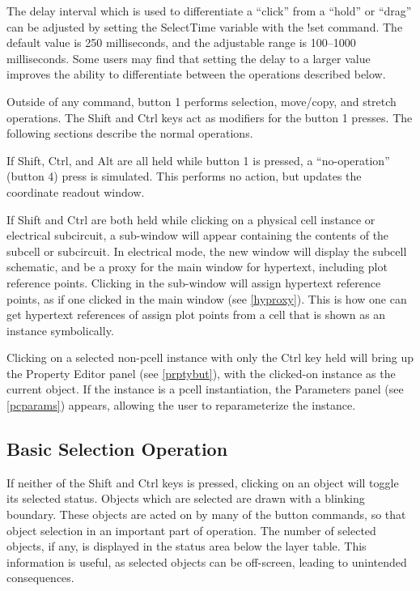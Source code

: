 The delay interval which is used to differentiate a ``click'' from a
``hold'' or ``drag'' can be adjusted by setting the {\cb SelectTime}
variable with the {\cb !set} command.  The default value is 250
milliseconds, and the adjustable range is 100--1000 milliseconds. 
Some users may find that setting the delay to a larger value improves
the ability to differentiate between the operations described below.

Outside of any command, button 1 performs selection, move/copy, and
stretch operations.  The {\kb Shift} and {\kb Ctrl} keys act as
modifiers for the button 1 presses.  The following sections describe
the normal operations.

If {\kb Shift}, {\kb Ctrl}, and {\kb Alt} are all held while button 1
is pressed, a ``no-operation'' (button 4) press is simulated.  This
performs no action, but updates the coordinate readout window.

If {\kb Shift} and {\kb Ctrl} are both held while clicking on a
physical cell instance or electrical subcircuit, a sub-window will
appear containing the contents of the subcell or subcircuit.  In
electrical mode, the new window will display the subcell schematic,
and be a proxy for the main window for hypertext, including plot
reference points.  Clicking in the sub-window will assign hypertext
reference points, as if one clicked in the main window (see
\ref{hyproxy}).  This is how one can get hypertext references of
assign plot points from a cell that is shown as an instance
symbolically.

Clicking on a selected non-pcell instance with only the {\kb Ctrl} key
held will bring up the {\cb Property Editor} panel (see
\ref{prptybut}), with the clicked-on instance as the current object. 
If the instance is a pcell instantiation, the {\cb Parameters} panel
(see \ref{pcparams}) appears, allowing the user to reparameterize the
instance.

\subsection{Basic Selection Operation}
\label{btnsel}

If neither of the {\kb Shift} and {\kb Ctrl} keys is pressed, clicking
on an object will toggle its selected status.  Objects which are
selected are drawn with a blinking boundary.  These objects are acted
on by many of the button commands, so that object selection in an
important part of {\Xic} operation.  The number of selected objects,
if any, is displayed in the status area below the layer table.  This
information is useful, as selected objects can be off-screen, leading
to unintended consequences.

